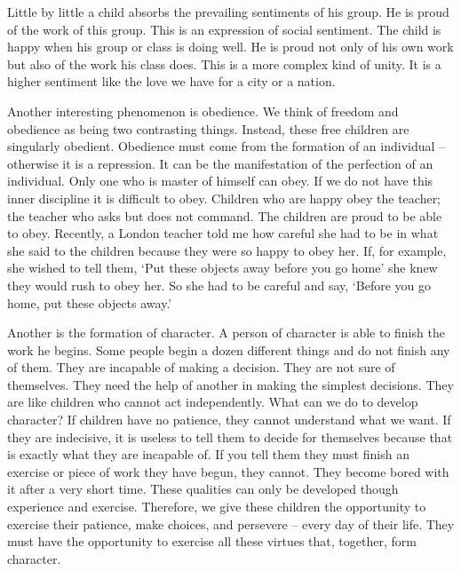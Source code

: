 \documentclass[lang=cn,10pt]{elegantbook}
\begin{document}
Little by little a child absorbs the prevailing sentiments of his group. He is proud of the work of this group. This is an expression of social sentiment. The child is happy when his group or class is doing well. He is proud not only of his own work but also of the work his class does. This is a more complex kind of unity. It is a higher sentiment like the love we have for a city or a nation.

Another interesting phenomenon is obedience. We think of freedom and obedience as being two contrasting things. Instead, these free children are singularly obedient. Obedience must come from the formation of an individual – otherwise it is a repression. It can be the manifestation of the perfection of an individual. Only one who is master of himself can obey. If we do not have this inner discipline it is difficult to obey. Children who are happy obey the teacher; the teacher who asks but does not command. The children are proud to be able to obey. Recently, a London teacher told me how careful she had to be in what she said to the children because they were so happy to obey her. If, for example, she wished to tell
them, ‘Put these objects away before you go home’ she knew they would rush to obey her. So she had to be careful and say, ‘Before you go home, put these objects away.’

Another is the formation of character. A person of character is able to finish the work he begins. Some people begin a dozen different things and do not finish any of them. They are incapable of making a decision. They are not sure of themselves. They need the help of another in making the simplest decisions. They are like children who cannot act independently. What can we do to develop character? If children have no patience, they cannot understand what we want. If they are indecisive, it is useless to tell them to decide for themselves because that is exactly what they are incapable of. If you tell them they must finish an exercise or piece of work they have begun, they cannot. They become bored with it after
a very short time. These qualities can only be developed though experience and exercise. Therefore, we give these children the opportunity to exercise their patience, make choices, and persevere – every day of their life. They must have the opportunity to exercise all these virtues that, together, form character.
\end{document}
